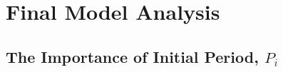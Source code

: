 \documentclass[fleqn,usenatbib]{mnras}
\begin{document}
\begin{equation}
	\label{eq:gaussian_density_function}


\end{equation}
\section{Final Model Analysis}
\subsubsection{}
\subsection{The Importance of Initial Period, $P_i$} \label{sec:initial_period}













\bsp	%
\label{lastpage}
\end{document}
